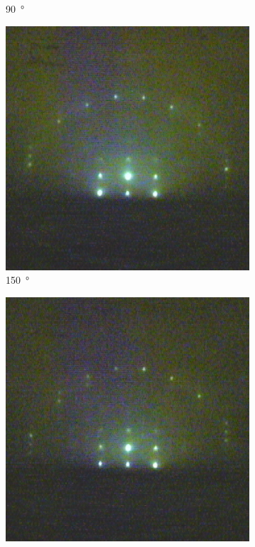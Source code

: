\begin{figure}
\begin{subfigure}{0.2\linewidth}
        \caption{\qty{90}{\degree}}
    \end{subfigure}
    \begin{subfigure}{0.2\linewidth}
        \includegraphics[width=\textwidth]{../data/edited/2_2_173deg.pdf}
        \caption{\qty{150}{\degree}}
    \end{subfigure}
    \begin{subfigure}{0.2\linewidth}
        \includegraphics[width=\textwidth]{../data/edited/2_2_233deg.pdf}

\end{subfigure}
\end{figure}

